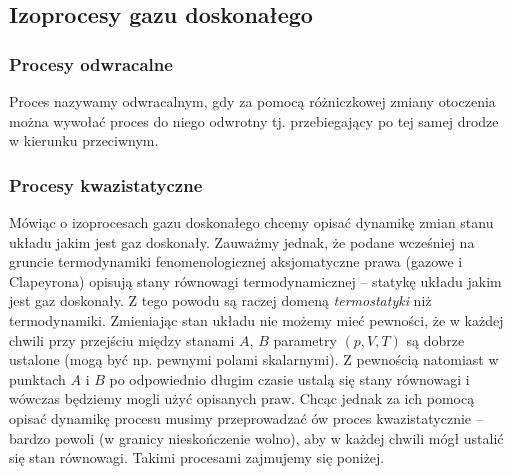 \documentclass[../main.tex]{subfiles}
\begin{document}
\subsection{Izoprocesy gazu doskonałego}
\subsubsection{Procesy odwracalne}
Proces nazywamy odwracalnym, gdy za pomocą różniczkowej zmiany otoczenia można wywołać proces do
niego odwrotny tj. przebiegający po tej samej drodze w kierunku przeciwnym.
\subsubsection{Procesy kwazistatyczne}
Mówiąc o izoprocesach gazu doskonałego chcemy opisać dynamikę zmian stanu układu jakim jest gaz
doskonały. Zauważmy jednak, że podane wcześniej na gruncie termodynamiki fenomenologicznej
aksjomatyczne prawa (gazowe i Clapeyrona) opisują stany równowagi termodynamicznej -- statykę układu
jakim jest gaz doskonały. Z tego powodu są raczej domeną \textit{termostatyki} niż termodynamiki.
Zmieniając stan układu nie możemy mieć pewności, że w każdej chwili przy przejściu między stanami
\(A\), \(B\) parametry \((p,V,T)\) są dobrze ustalone (mogą być np. pewnymi polami skalarnymi). Z
pewnością natomiast w punktach \(A\) i \(B\) po odpowiednio długim czasie ustalą się stany równowagi
i wówczas będziemy mogli użyć opisanych praw. Chcąc jednak za ich pomocą opisać dynamikę procesu
musimy przeprowadzać ów proces kwazistatycznie -- bardzo powoli (w granicy nieskończenie wolno), aby
w każdej chwili mógł ustalić się stan równowagi. Takimi procesami zajmujemy się poniżej.
\end{document}
